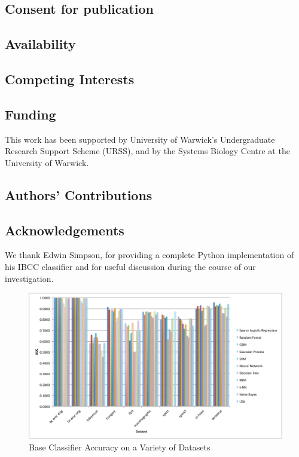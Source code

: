 \documentclass{document}
\begin{document}
	\subsection{Consent for publication}
	\subsection{Availability}
	\subsection{Competing Interests}
	\subsection{Funding}
	This work has been supported by University of Warwick's Undergraduate Research Support Scheme (URSS), and by the Systems Biology Centre at the University of Warwick.
	\subsection{Authors' Contributions}
	\subsection{Acknowledgements}
	We thank Edwin Simpson, for providing a complete Python implementation of his IBCC classifier and for useful discussion during the course of our investigation.



%
%
%
%
%
%
%
%
%


\clearpage

\begin{figure}[p]
\centering
\includegraphics[angle=0, width=175mm]{basegraph.eps}
\caption{Base Classifier Accuracy on a Variety of Datasets}
\label{fig:01}
\end{figure}
\end{document}
